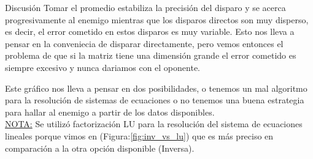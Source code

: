 \begin{section}{Discusión}
	Tomar el promedio estabiliza la precisión del disparo y se acerca progresivamente al enemigo mientras que los disparos directos son muy disperso, es decir, el error cometido en estos disparos es muy variable. Esto nos lleva a pensar en la conveniecia de disparar directamente, pero vemos entonces el problema de que si la matriz tiene una dimensión grande el error cometido es siempre excesivo y nunca dariamos con el oponente.
	
	Este gráfico nos lleva a pensar en dos posibilidades, o tenemos un mal algoritmo para la resolución de sistemas de ecuaciones o no tenemos una buena estrategia para hallar al enemigo a partir de los datos disponibles.\\

	\underline{NOTA:} Se utilizó factorización LU para la resolución del sistema de ecuaciones lineales porque vimos en (Figura:\ref{fig:inv_vs_lu}) que es más preciso en comparación a la otra opción disponible (Inversa). 

\end{section}
